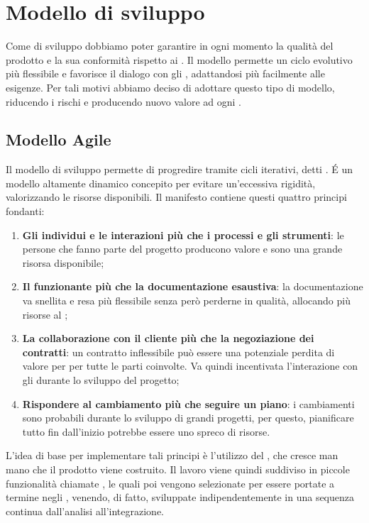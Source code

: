 	\section{Modello di sviluppo}
Come  di sviluppo dobbiamo poter garantire in ogni momento la qualità del prodotto  e la sua conformità rispetto ai . \newline
Il modello  permette un ciclo evolutivo più flessibile e favorisce il dialogo con gli , adattandosi più facilmente alle esigenze. \newline 
Per tali motivi abbiamo deciso di adottare questo tipo di modello, riducendo i rischi e producendo nuovo valore ad ogni .

\subsection{Modello Agile}
Il modello di sviluppo  permette di progredire tramite cicli iterativi, detti .
É un modello altamente dinamico concepito per evitare un'eccessiva rigidità, valorizzando le risorse disponibili. \newline
Il manifesto  contiene questi quattro principi fondanti:

\begin{enumerate}
    \item \textbf{Gli individui e le interazioni più che i processi e gli strumenti}: le persone che fanno parte del progetto producono valore e sono una grande risorsa disponibile;
    \item \textbf{Il  funzionante più che la documentazione esaustiva}: la documentazione va snellita e resa più flessibile senza però perderne in qualità, allocando più risorse al ;
    \item \textbf{La collaborazione con il cliente più che la negoziazione dei contratti}: un contratto inflessibile può essere una potenziale perdita di valore per per tutte le parti coinvolte. Va quindi incentivata l’interazione con gli  durante lo sviluppo del progetto;
    \item \textbf{Rispondere al cambiamento più che seguire un piano}: i cambiamenti sono probabili durante lo sviluppo di grandi progetti, per questo, pianificare tutto fin dall'inizio potrebbe essere uno spreco di risorse.
\end{enumerate}
L’idea di base per implementare tali principi è l’utilizzo del \textbf{}, che cresce man mano che il prodotto viene costruito. \newline
Il lavoro viene quindi suddiviso in piccole funzionalità chiamate \textbf{}, le quali poi vengono selezionate per essere portate a termine negli \textbf{}, venendo, di fatto, sviluppate indipendentemente in una sequenza continua dall’analisi all’integrazione. \newline

